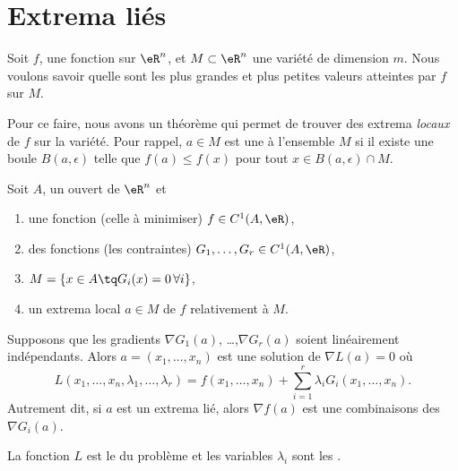 \section{Extrema liés}

Soit $f$, une fonction sur $\eR^n$, et $M\subset \eR^n$ une variété de dimension $m$. Nous voulons savoir quelle sont les plus grandes et plus petites valeurs atteintes par $f$ sur $M$.

Pour ce faire, nous avons un théorème qui permet de trouver des extrema \emph{locaux} de $f$ sur la variété. Pour rappel, $a\in M$ est une  à l'ensemble $M$ si il existe une boule $B(a,\epsilon)$ telle que $f(a)\leq f(x)$ pour tout $x\in B(a,\epsilon)\cap M$.

\begin{theorem} \label{ThoRGJosS}
	Soit \( A\), un ouvert de \( \eR^n\) et
	\begin{enumerate}
		\item
			une fonction (celle à minimiser) $f\in C^1(A,\eR)$,
		\item 
			des fonctions (les contraintes) $G_1,\ldots,G_r\in C^1(A,\eR)$,
		\item
			$M=\{ x\in A\tq G_i(x)=0\,\forall i\}$,
		\item
			un extrema local $a\in M$ de $f$ relativement à $M$.
	\end{enumerate}
	Supposons que les gradients $\nabla G_1(a)$, \ldots,$\nabla G_r(a)$ soient linéairement indépendants. Alors $a=(x_1,\ldots,x_n)$ est une solution de \( \nabla L(a)=0\) où
	\begin{equation}
		L(x_1,\ldots,x_n,\lambda_1,\ldots,\lambda_r)=f(x_1,\ldots,x_n)+\sum_{i=1}^r\lambda_iG_i(x_1,\ldots,x_n).
	\end{equation}
    Autrement dit, si \( a\) est un extrema lié, alors \( \nabla f(a)\) est une combinaisons des \( \nabla G_i(a)\).
\end{theorem}
La fonction $L$ est le  du problème et les variables \( \lambda_i\) sont les .

